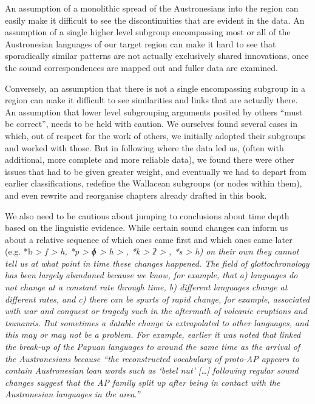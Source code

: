 An assumption of a monolithic spread of the Austronesians into
the region can easily make it difficult to see the discontinuities
that are evident in the data.
An assumption of a single higher level subgroup encompassing
most or all of the Austronesian languages of our target region
can make it hard to see that sporadically similar patterns are
not actually exclusively shared innovations,
once the sound correspondences are mapped out
and fuller data are examined.

Conversely, an assumption that there is not a single encompassing
subgroup in a region can make it difficult to see similarities
and links that are actually there.
An assumption that lower level subgrouping arguments posited
by others “must be correct”,
needs to be held with caution.
We ourselves found several cases in which,
out of respect for the work of others,
we initially adopted their subgroups
and worked with those.
But in following where the data led us,
(often with additional, more complete
and more reliable data),
we found there were other issues that had to be given greater
weight, and eventually we had to depart from earlier classifications,
redefine the Wallacean subgroups (or nodes within them),
and even rewrite and reorganise chapters already drafted in this book.

We also need to be cautious about jumping to conclusions about
time depth based on the linguistic evidence.
While certain sound changes can inform us about 
a relative sequence of which ones 
came first and which ones came later
(e.g.
*b > \it{f > h},
*p > \it{ɸ > h >} {\0},
*k > \it{ʔ} > {\0},
*s > \it{h}) on their own they cannot tell us at
what point in time these changes happened.
The field of glottochronology has been largely abandoned because
we know, for example, that a) languages do not change at a constant rate
through time, b) different languages change at different rates,
and c) there can be spurts of rapid change,
for example, associated with war
and conquest or tragedy such in the aftermath of volcanic eruptions and tsunamis.
But sometimes a datable change is extrapolated to other languages,
and this may or may not be a problem.
For example, earlier it was noted that \citet[10]{Klamer2017} linked
the break-up of the  Papuan languages to around
the same time as the arrival of the Austronesians because “the
reconstructed vocabulary of proto-AP appears to contain Austronesian
loan words such as ‘betel nut’ [{\ldots}] following regular sound
changes suggest that the AP family split up after being in contact
with the Austronesian languages in the area.”

